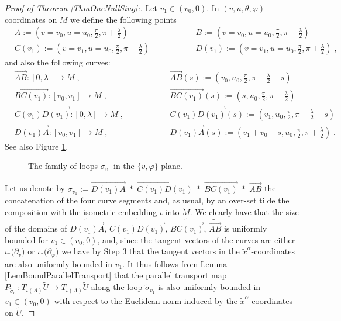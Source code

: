 \documentclass[reqno]{article}
\begin{document}
\begin{proof}[Proof of Theorem \ref{ThmOneNullSing}:]
Let $v_1 \in (v_0, 0)$. In $(v,u, \theta, \varphi)$-coordinates on $M$ we define the following points
\begin{equation*}
\begin{aligned}
&A := (v = v_0, u= u_0, \frac{\pi}{2}, \pi + \frac{\lambda}{2}) \qquad \qquad &&B:= (v = v_0, u = u_0, \frac{\pi}{2}, \pi - \frac{\lambda}{2}) \\
&C(v_1):=( v=v_1, u=u_0, \frac{\pi}{2}, \pi - \frac{\lambda}{2}) \qquad \qquad &&D(v_1) := (v = v_1, u = u_0, \frac{\pi}{2}, \pi + \frac{\lambda}{2}) \;,
\end{aligned}
\end{equation*}
and also the following curves:
\begin{equation*}
\begin{aligned}
&\overrightarrow{AB} : [0, \lambda] \to M\;, \qquad \qquad &&\overrightarrow{AB}(s) :=(v_0, u_0, \frac{\pi}{2}, \pi + \frac{\lambda}{2} - s) \\
&\overrightarrow{BC(v_1)} : [v_0, v_1] \to M \;, \qquad \qquad &&\overrightarrow{BC(v_1)}(s) := (s, u_0, \frac{\pi}{2}, \pi - \frac{\lambda}{2}) \\
&\overrightarrow{C(v_1)D(v_1)} : [0, \lambda] \to M\;, \qquad \qquad &&\overrightarrow{C(v_1)D(v_1)}(s) := (v_1, u_0, \frac{\pi}{2}, \pi - \frac{\lambda}{2} + s ) \\
&\overrightarrow{D(v_1) A} : [v_0, v_1] \to M \;, \qquad \qquad &&\overrightarrow{D(v_1)A}(s) := (v_1 + v_0 - s, u_0, \frac{\pi}{2}, \pi + \frac{\lambda}{2}) \;.
\end{aligned}
\end{equation*}
See also Figure \ref{FigLoopsNull}.
\begin{figure}[h]
\centering
 \def\svgwidth{7cm}
   
      \caption{The family of loops $\sigma_{v_1}$ in the $\{v, \varphi\}$-plane.} \label{FigLoopsNull}
\end{figure}
Let us denote by $\sigma_{v_1} := \overrightarrow{D(v_1)A}\; * \; \overrightarrow{C(v_1) D(v_1)} \; * \; \overrightarrow{BC(v_1)} \; * \; \overrightarrow{AB} $ the concatenation of the four curve segments and, as usual, by an over-set tilde the composition with the isometric embedding $\iota$ into $\tilde{M}$. We clearly have that the size of the domains of $\widetilde{\overrightarrow{D(v_1)A}}$, $\widetilde{\overrightarrow{C(v_1) D(v_1)} }$, $\widetilde{\overrightarrow{BC(v_1)} }$, $\widetilde{\overrightarrow{AB}}$ is uniformly bounded for $v_1 \in (v_0, 0)$, and, since the tangent vectors of the curves are either $\iota_*\big(\partial_v\big)$ or $\iota_*\big(\partial_\varphi\big)$ we have by Step 3 that the tangent vectors in the $\tilde{x}^\alpha$-coordinates are also uniformly bounded in $v_1$. It thus follows from Lemma \ref{LemBoundParallelTransport} that the parallel transport map $P_{\tilde{\sigma}_{v_1}} : T_{\iota(A)} \tilde{U} \to T_{\iota(A)} \tilde{U}$ along the loop $\tilde{\sigma}_{v_1}$ is also uniformly bounded in $v_1 \in (v_0, 0)$ with respect to the Euclidean norm induced by the $\tilde{x}^\alpha$-coordinates on $\tilde{U}$.
\newline


\end{proof}
\end{document}
